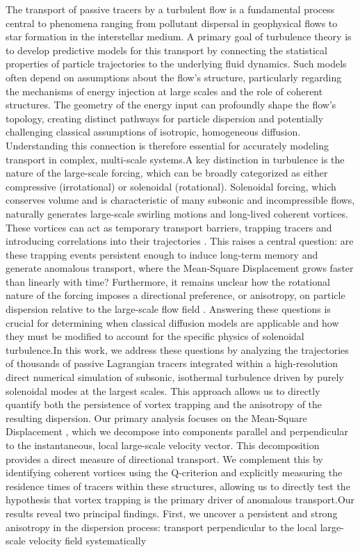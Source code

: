 \documentclass[]{article}
\begin{document}
The transport of passive tracers by a turbulent flow is a fundamental process central to phenomena ranging from pollutant dispersal in geophysical flows to star formation in the interstellar medium. A primary goal of turbulence theory is to develop predictive models for this transport by connecting the statistical properties of particle trajectories to the underlying fluid dynamics. Such models often depend on assumptions about the flow's structure, particularly regarding the mechanisms of energy injection at large scales and the role of coherent structures. The geometry of the energy input can profoundly shape the flow's topology, creating distinct pathways for particle dispersion and potentially challenging classical assumptions of isotropic, homogeneous diffusion. Understanding this connection is therefore essential for accurately modeling transport in complex, multi-scale systems.A key distinction in turbulence is the nature of the large-scale forcing, which can be broadly categorized as either compressive (irrotational) or solenoidal (rotational). Solenoidal forcing, which conserves volume and is characteristic of many subsonic and incompressible flows, naturally generates large-scale swirling motions and long-lived coherent vortices. These vortices can act as temporary transport barriers, trapping tracers and introducing correlations into their trajectories  \citep{freitas2026intermittencysuppressionturbulenceforced}. This raises a central question: are these trapping events persistent enough to induce long-term memory and generate anomalous transport, where the Mean-Square Displacement grows faster than linearly with time? Furthermore, it remains unclear how the rotational nature of the forcing imposes a directional preference, or anisotropy, on particle dispersion relative to the large-scale flow field  \citep{mizerski2022anisotropicturbulentviscositylargescale}. Answering these questions is crucial for determining when classical diffusion models are applicable and how they must be modified to account for the specific physics of solenoidal turbulence.In this work, we address these questions by analyzing the trajectories of thousands of passive Lagrangian tracers  \citep{komorowski2005stationaritylagrangianobservationspassive} integrated within a high-resolution direct numerical simulation of subsonic, isothermal turbulence driven by purely solenoidal modes at the largest scales. This approach allows us to directly quantify both the persistence of vortex trapping and the anisotropy of the resulting dispersion. Our primary analysis focuses on the Mean-Square Displacement  \citep{küchler2024lagrangianparticletrackinglarge}, which we decompose into components parallel and perpendicular to the instantaneous, local large-scale velocity vector. This decomposition provides a direct measure of directional transport. We complement this by identifying coherent vortices using the Q-criterion and explicitly measuring the residence times of tracers within these structures, allowing us to directly test the hypothesis that vortex trapping is the primary driver of anomalous transport.Our results reveal two principal findings. First, we uncover a persistent and strong anisotropy in the dispersion process: transport perpendicular to the local large-scale velocity field systematically 
\end{document}
